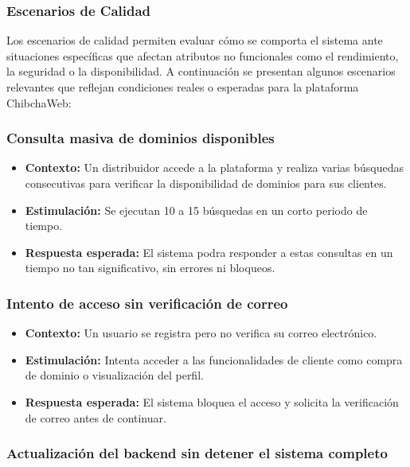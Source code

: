 \subsubsection{Escenarios de Calidad}
Los escenarios de calidad permiten evaluar cómo se comporta el sistema ante situaciones específicas que afectan atributos no funcionales como el rendimiento, la seguridad o la disponibilidad. A continuación se presentan algunos escenarios relevantes que reflejan condiciones reales o esperadas para la plataforma ChibchaWeb:

\subsubsection*{Consulta masiva de dominios disponibles}

\begin{itemize}
\item \textbf{Contexto:} Un distribuidor accede a la plataforma y realiza varias búsquedas consecutivas para verificar la disponibilidad de dominios para sus clientes.

\item \textbf{Estimulación:} Se ejecutan 10 a 15 búsquedas en un corto periodo de tiempo.

\item \textbf{Respuesta esperada:} El sistema podra responder a estas consultas en un tiempo no tan significativo, sin errores ni bloqueos.
\end{itemize}

\subsubsection*{Intento de acceso sin verificación de correo}

\begin{itemize}
\item \textbf{Contexto:} Un usuario se registra pero no verifica su correo electrónico.

\item \textbf{Estimulación:} Intenta acceder a las funcionalidades de cliente como compra de dominio o visualización del perfil.

\item \textbf{Respuesta esperada:} El sistema bloquea el acceso y solicita la verificación de correo antes de continuar.
\end{itemize}

 \subsubsection*{Actualización del backend sin detener el sistema completo}

